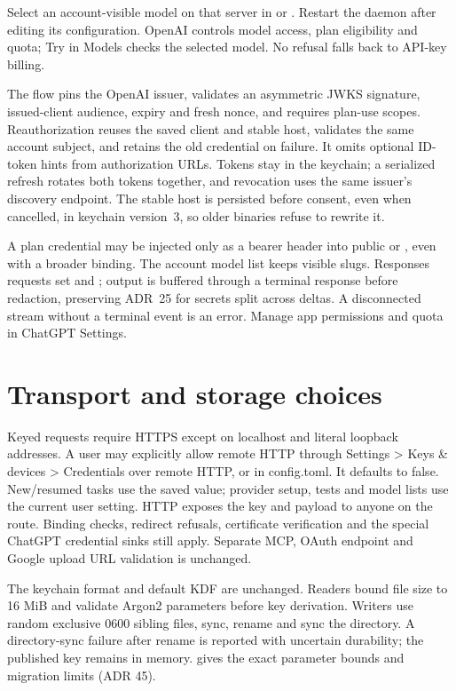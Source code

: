 Select an account-visible model on that server in \code{[control]} or
. Restart the daemon after editing its configuration.
OpenAI controls model access, plan eligibility and quota; Try in Models
checks the selected model. No refusal falls back to API-key billing.

The flow pins the OpenAI issuer, validates an asymmetric JWKS signature,
issued-client audience, expiry and fresh nonce, and requires plan-use
scopes. Reauthorization reuses the saved client and stable host, validates
the same account subject, and retains the old credential on failure. It
omits optional ID-token hints from authorization URLs. Tokens stay in the
keychain; a serialized refresh rotates both tokens together, and revocation
uses the same issuer's discovery endpoint. The stable host is persisted
before consent, even when cancelled, in keychain version~3, so older
binaries refuse to rewrite it.

A plan credential may be injected only as a bearer header into public
 or , even with a broader
binding. The account model list keeps visible slugs. Responses requests
set  and ; output is buffered through
a terminal response before redaction, preserving ADR~25 for secrets split
across deltas. A disconnected stream without a terminal event is an error.
Manage app permissions and quota in ChatGPT Settings.

\section{Transport and storage choices}

Keyed requests require HTTPS except on localhost and literal loopback addresses.
A user may explicitly allow remote HTTP through Settings > Keys \& devices > Credentials
over remote HTTP, or  in config.toml.
It defaults to false. New/resumed tasks use the saved value; provider setup, tests
and model lists use the current user setting. HTTP exposes the key and payload to
anyone on the route. Binding checks, redirect refusals, certificate verification
and the special ChatGPT credential sinks still apply. Separate MCP, OAuth endpoint
and Google upload URL validation is unchanged.

The keychain format and default KDF are unchanged. Readers bound file size to
16 MiB and validate Argon2 parameters before key derivation. Writers use random
exclusive 0600 sibling files, sync, rename and sync the directory. A directory-sync
failure after rename is reported with uncertain durability; the published key
remains in memory.  gives the exact parameter bounds and
migration limits (ADR 45).

